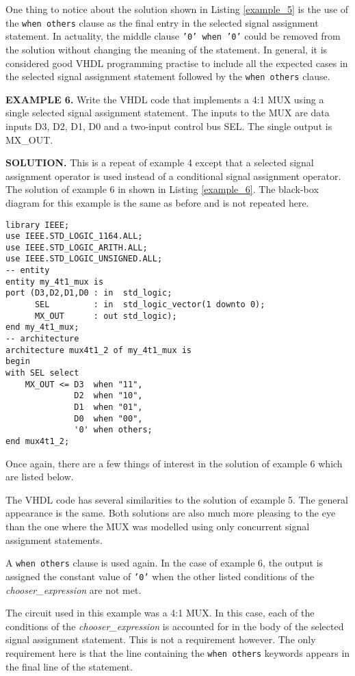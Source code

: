 One thing to notice about the solution shown in Listing \ref{example_5} is the use of the \texttt{when others} clause as the final entry in the selected signal assignment statement. In actuality, the middle clause \texttt{'0' when '0'} could be removed from the solution without changing the meaning of the statement. In general, it is considered good VHDL programming practise to include all the expected cases in the selected signal assignment statement followed by the \texttt{when others} clause.
\begin{leftbar}
\noindent
\textbf{EXAMPLE 6.}
Write the VHDL code that implements a 4:1 MUX using a single selected signal assignment statement. The inputs to the MUX are data inputs D3, D2, D1, D0 and a two-input control bus SEL. The single output is MX\_OUT.
\end{leftbar}
\noindent
\textbf{SOLUTION.} This is a repeat of example 4 except that a selected signal assignment operator is used instead of a conditional signal assignment operator. The solution of example 6 in shown in Listing \ref{example_6}. The black-box diagram for this example is the same as before and is not repeated here.
\begin{lstlisting}[label=example_6, caption=Solution of example 6.]
library IEEE;
use IEEE.STD_LOGIC_1164.ALL;
use IEEE.STD_LOGIC_ARITH.ALL;
use IEEE.STD_LOGIC_UNSIGNED.ALL;
-- entity
entity my_4t1_mux is
port (D3,D2,D1,D0 : in  std_logic;
      SEL         : in  std_logic_vector(1 downto 0);
      MX_OUT      : out std_logic);
end my_4t1_mux;
-- architecture
architecture mux4t1_2 of my_4t1_mux is
begin
with SEL select
	MX_OUT <= D3  when "11",
	          D2  when "10",
	          D1  when "01",
	          D0  when "00",
	          '0' when others;
end mux4t1_2;
\end{lstlisting}

Once again, there are a few things of interest in the solution of example 6 which are listed below.
\begin{my_list}
\item The VHDL code has several similarities to the solution of example 5. The general appearance is the same. Both solutions are also much more pleasing to the eye than the one where the MUX was modelled using only concurrent signal assignment statements.
\item A \texttt{when others} clause is used again. In the case of example 6, the output is assigned the constant value of \texttt{'0'} when the other listed conditions of the \textit{chooser\_expression} are not met.
\item The circuit used in this example was a 4:1 MUX. In this case, each of the conditions of the \textit{chooser\_expression} is accounted for in the body of the selected signal assignment statement. This is not a requirement however. The only requirement here is that the line containing the \texttt{when others} keywords appears in the final line of the statement.
\end{my_list}

